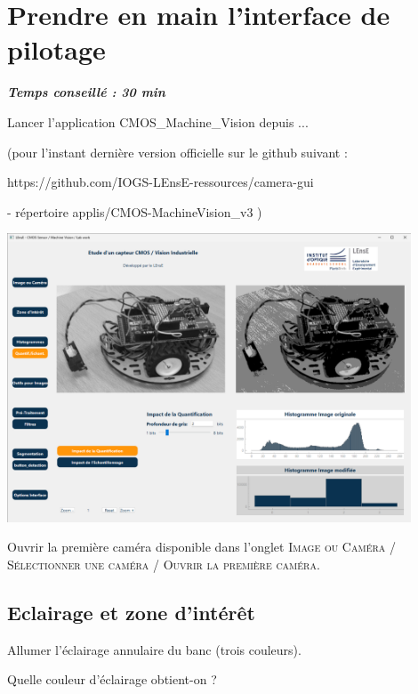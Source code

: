 \documentclass[a4paper,11pt,titlepage]{article} %
\begin{document}

\section{Prendre en main l'interface de pilotage}

\begin{center} \textbf{\textit{Temps conseillé : 30 min}} \end{center}

\Manip Lancer l'application CMOS\_Machine\_Vision depuis ...

(pour l'instant dernière version officielle sur le github suivant : 

https://github.com/IOGS-LEnsE-ressources/camera-gui  

-  répertoire applis/CMOS-MachineVision\_v3  )

\begin{center}
	\includegraphics[width=0.9\textwidth]{./images/camera_gui.png}
\end{center}


\Manip Ouvrir la première caméra disponible dans l'onglet \textsc{Image ou Caméra} / \textsc{Sélectionner une caméra} / \textsc{Ouvrir la première caméra}.

\subsection{Eclairage et zone d'intérêt}

\Manip Allumer l'éclairage annulaire du banc (trois couleurs). 

\Quest Quelle couleur d'éclairage obtient-on ?
\end{document}
